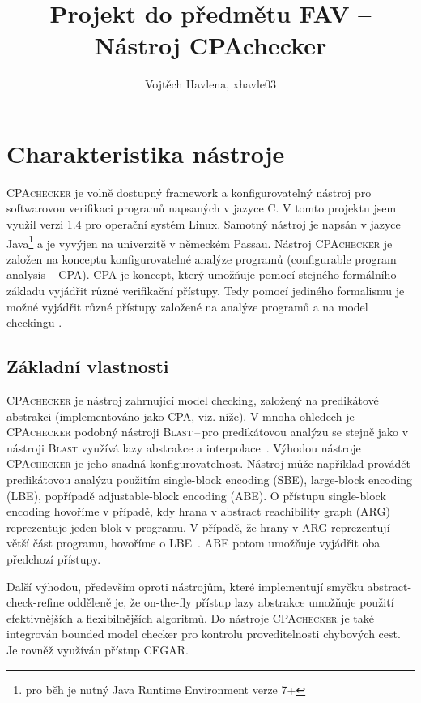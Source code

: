 \documentclass[a4paper,12pt]{article}
\title{Projekt do předmětu FAV -- Nástroj CPAchecker}
\author{Vojtěch Havlena, xhavle03}
\begin{document}
\maketitle

\section{Charakteristika nástroje}
\textsc{CPAchecker} je volně dostupný framework a konfigurovatelný nástroj pro softwarovou verifikaci programů napsaných v jazyce C.
V tomto projektu jsem využil verzi 1.4 pro operační systém Linux.
Samotný nástroj je napsán v jazyce Java\footnote{pro běh je nutný Java Runtime Environment verze 7+} a je vyvýjen na univerzitě v německém Passau. Nástroj \textsc{CPAchecker} je založen na 
konceptu konfigurovatelné analýze programů (configurable program analysis -- CPA).
CPA je koncept, který umožňuje pomocí stejného formálního základu vyjádřit různé verifikační přístupy. Tedy pomocí jediného
formalismu je možné vyjádřit různé přístupy založené na analýze programů a na model checkingu \cite{cpa}. 

\subsection{Základní vlastnosti}
\textsc{CPAchecker} je nástroj zahrnující model checking, založený na predikátové abstrakci (implementováno jako CPA, viz. níže). V mnoha 
ohledech je \textsc{CPAchecker} podobný nástroji \textsc{Blast}\,--\,pro predikátovou analýzu se stejně jako v 
nástroji \textsc{Blast} využívá lazy abstrakce a interpolace~\cite{cpa}. Výhodou nástroje \textsc{CPAchecker} je jeho snadná konfigurovatelnost.
Nástroj může například provádět predikátovou analýzu použitím single-block encoding (SBE), large-block encoding (LBE), popřípadě
adjustable-block encoding (ABE). O přístupu single-block encoding hovoříme v případě, kdy hrana v abstract reachibility graph (ARG)
reprezentuje jeden blok v programu. V případě, že hrany v ARG reprezentují větší část programu, hovoříme o LBE~\cite{lbe}. ABE potom
umožňuje vyjádřit oba předchozí přístupy. 

Další výhodou, především
oproti nástrojům, které implementují smyčku abstract-check-refine odděleně je, že on-the-fly přístup lazy abstrakce umožňuje 
použití efektivnějších a flexibilnějších algoritmů. Do nástroje \textsc{CPAchecker} je také integrován bounded
model checker pro kontrolu proveditelnosti chybových cest. Je rovněž využíván přístup CEGAR.
\end{document}
